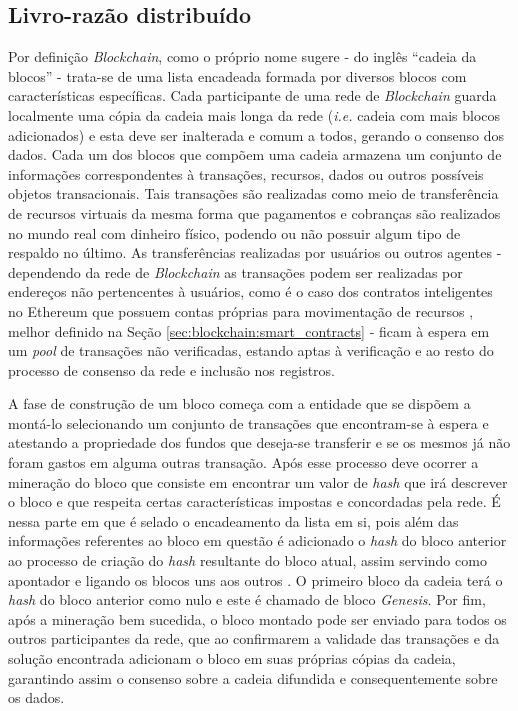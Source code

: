 \subsection{Livro-razão distribuído}
\label{subsec:blockchain:specs}
Por definição \textit{Blockchain}, como o próprio nome sugere - do inglês ``cadeia da blocos'' - trata-se de uma lista encadeada formada por diversos blocos com características específicas. Cada participante de uma rede de \textit{Blockchain} guarda localmente uma cópia da cadeia mais longa da rede (\textit{i.e.} cadeia com mais blocos adicionados) e esta deve ser inalterada e comum a todos, gerando o consenso dos dados.
%
Cada um dos blocos que compõem uma cadeia armazena um conjunto de informações correspondentes à transações, recursos, dados ou outros possíveis objetos transacionais.
%
Tais transações são realizadas como meio de transferência de recursos virtuais da mesma forma que pagamentos e cobranças são realizados no mundo real com dinheiro físico, podendo ou não possuir algum tipo de respaldo no último.
%
As transferências realizadas por usuários ou outros agentes
%
- dependendo da rede de \textit{Blockchain} as transações podem ser realizadas por endereços não pertencentes à usuários, como é o caso dos contratos inteligentes no Ethereum que possuem contas próprias para movimentação de recursos \cite{blockchain:ethereum}, melhor definido na Seção \ref{sec:blockchain:smart_contracts} -
%
ficam à espera em um \textit{pool} de transações não verificadas, estando aptas à verificação e ao resto do processo de consenso da rede e inclusão nos registros.

%
A fase de construção de um bloco começa com a entidade que se dispõem a montá-lo selecionando um conjunto de transações que encontram-se à espera e atestando a propriedade dos fundos que deseja-se transferir e se os mesmos já não foram gastos em alguma outras transação. Após esse processo deve ocorrer a mineração do bloco que consiste em encontrar um valor de \textit{hash} que irá descrever o bloco e que respeita certas características impostas e concordadas pela rede. É nessa parte em que é selado o encadeamento da lista em si, pois além das informações referentes ao bloco em questão é adicionado o \textit{hash} do bloco anterior ao processo de criação do \textit{hash} resultante do bloco atual, assim servindo como apontador e ligando os blocos uns aos outros \cite{blockchain:capitulo5}. O primeiro bloco da cadeia terá o \textit{hash} do bloco anterior como nulo e este é chamado de bloco \textit{Genesis}. Por fim, após a mineração bem sucedida, o bloco montado pode ser enviado para todos os outros participantes da rede, que ao confirmarem a validade das transações e da solução encontrada adicionam o bloco em suas próprias cópias da cadeia, garantindo assim o consenso sobre a cadeia difundida e consequentemente sobre os dados.

